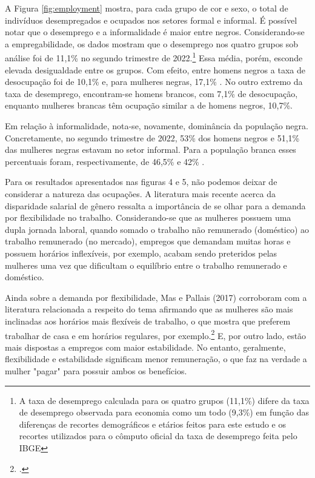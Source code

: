 \documentclass[12pt]{article}
\begin{document}
\par A Figura \ref{fig:employment} mostra, para cada grupo de cor e sexo, o total de indivíduos desempregados e ocupados nos setores formal e informal. É possível notar que o desemprego e a informalidade é maior entre negros. Considerando-se a empregabilidade, os dados mostram que o desemprego nos quatro grupos sob análise foi de 11,1\% no segundo trimestre de 2022.\footnote{A taxa de desemprego calculada para os quatro grupos (11,1\%) difere da taxa de desemprego observada para economia como um todo (9,3\%) em função das diferenças de recortes demográficos e etários feitos para este estudo e os recortes utilizados para o cômputo oficial da taxa de desemprego feita pelo IBGE} Essa média, porém, esconde elevada desigualdade entre os grupos. Com efeito, entre homens negros a taxa de desocupação foi de 10,1\% e, para mulheres negras, 17,1\% . No outro extremo da taxa de desemprego, encontram-se homens brancos, com 7,1\% de desocupação, enquanto mulheres brancas têm ocupação similar a de homens negros, 10,7\%.

\par Em relação à informalidade, nota-se, novamente, dominância da população negra. Concretamente, no segundo trimestre de 2022, 53\% dos homens negros e 51,1\% das mulheres negras estavam no setor informal. Para a população branca esses percentuais foram, respectivamente, de 46,5\%  e 42\% . 

\par Para os resultados apresentados nas figuras 4 e 5, não podemos deixar de considerar a natureza das ocupações. A literatura mais recente acerca da disparidade salarial de gênero ressalta a importância de se olhar para a demanda por flexibilidade no trabalho. Considerando-se que as mulheres possuem uma dupla jornada laboral, quando somado o trabalho não remunerado (doméstico) ao trabalho remunerado (no mercado), empregos que demandam muitas horas e possuem horários inflexíveis, por exemplo, acabam sendo preteridos pelas mulheres uma vez que dificultam o equilíbrio entre o trabalho remunerado e doméstico. 

\par Ainda sobre a demanda por flexibilidade, Mas e Pallais (2017) corroboram com a literatura relacionada a respeito do tema afirmando que as mulheres são mais inclinadas aos horários mais flexíveis de trabalho, o que mostra que preferem trabalhar de casa e em horários regulares, por exemplo.\footcite{maspallais2017} E, por outro lado,  estão mais dispostas a empregos com maior estabilidade. No entanto, geralmente, flexibilidade e estabilidade significam menor remuneração, o que faz na verdade a mulher "pagar" para possuir ambos os benefícios. 
\end{document}
